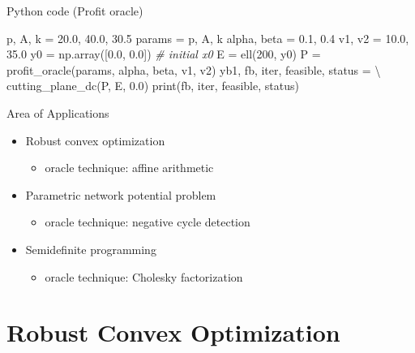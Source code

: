 \documentclass[10pt,ignorenonframetext,serif,onlymath]{beamer}
\newenvironment{Shaded}{}{}
\newcommand{\BuiltInTok}[1]{#1}
\newcommand{\CommentTok}[1]{\textcolor[rgb]{0.38,0.63,0.69}{\textit{#1}}}
\newcommand{\DecValTok}[1]{\textcolor[rgb]{0.25,0.63,0.44}{#1}}
\newcommand{\FloatTok}[1]{\textcolor[rgb]{0.25,0.63,0.44}{#1}}
\newcommand{\NormalTok}[1]{#1}
\newcommand{\OperatorTok}[1]{\textcolor[rgb]{0.40,0.40,0.40}{#1}}
\providecommand{\tightlist}{%
  \setlength{\itemsep}{0pt}\setlength{\parskip}{0pt}}
\begin{document}
\begin{frame}{Python code (Profit oracle)}
\begin{Shaded}
\begin{Highlighting}[]
\NormalTok{p, A, k }\OperatorTok{=} \FloatTok{20.0}\NormalTok{, }\FloatTok{40.0}\NormalTok{, }\FloatTok{30.5}
\NormalTok{params }\OperatorTok{=}\NormalTok{ p, A, k}
\NormalTok{alpha, beta }\OperatorTok{=} \FloatTok{0.1}\NormalTok{, }\FloatTok{0.4}
\NormalTok{v1, v2 }\OperatorTok{=} \FloatTok{10.0}\NormalTok{, }\FloatTok{35.0}
\NormalTok{y0 }\OperatorTok{=}\NormalTok{ np.array([}\FloatTok{0.0}\NormalTok{, }\FloatTok{0.0}\NormalTok{])  }\CommentTok{# initial x0}
\NormalTok{E }\OperatorTok{=}\NormalTok{ ell(}\DecValTok{200}\NormalTok{, y0)}
\NormalTok{P }\OperatorTok{=}\NormalTok{ profit_oracle(params, alpha, beta, v1, v2)}
\NormalTok{yb1, fb, }\BuiltInTok{iter}\NormalTok{, feasible, status }\OperatorTok{=} \OperatorTok{\textbackslash{}}
\NormalTok{    cutting_plane_dc(P, E, }\FloatTok{0.0}\NormalTok{)}
\BuiltInTok{print}\NormalTok{(fb, }\BuiltInTok{iter}\NormalTok{, feasible, status)}
\end{Highlighting}
\end{Shaded}

\end{frame}

\begin{frame}{Area of Applications}
\protect\hypertarget{sec:area-of-applications}{}

\begin{itemize}
\tightlist
\item
  Robust convex optimization

  \begin{itemize}
  \tightlist
  \item
    oracle technique: affine arithmetic
  \end{itemize}
\item
  Parametric network potential problem

  \begin{itemize}
  \tightlist
  \item
    oracle technique: negative cycle detection
  \end{itemize}
\item
  Semidefinite programming

  \begin{itemize}
  \tightlist
  \item
    oracle technique: Cholesky factorization
  \end{itemize}
\end{itemize}

\end{frame}

\hypertarget{sec:robust-convex-optimization}{%
\section{Robust Convex
Optimization}\label{sec:robust-convex-optimization}}
\end{document}

